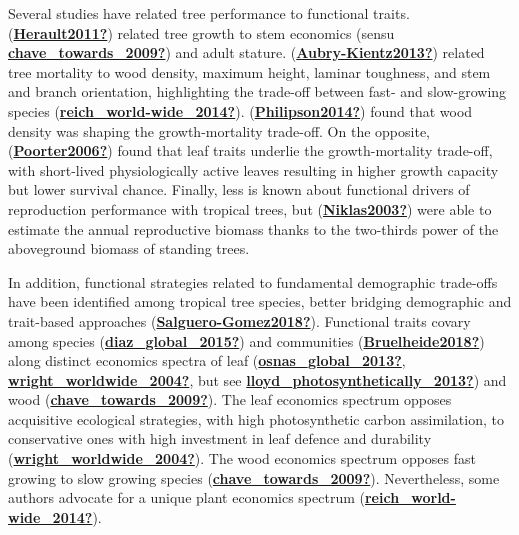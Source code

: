 \documentclass[12pt,twoside,a4paper, a]{article}
\begin{document}
Several studies have related tree performance to functional traits.
(\protect\hyperlink{ref-Herault2011}{\textbf{Herault2011?}}) related tree growth to stem economics (sensu \protect\hyperlink{ref-chave_towards_2009}{\textbf{chave\_towards\_2009?}}) and adult stature.
(\protect\hyperlink{ref-Aubry-Kientz2013}{\textbf{Aubry-Kientz2013?}}) related tree mortality to wood density, maximum height, laminar toughness, and stem and branch orientation, highlighting the trade-off between fast- and slow-growing species (\protect\hyperlink{ref-reich_world-wide_2014}{\textbf{reich\_world-wide\_2014?}}).
(\protect\hyperlink{ref-Philipson2014}{\textbf{Philipson2014?}}) found that wood density was shaping the growth-mortality trade-off.
On the opposite, (\protect\hyperlink{ref-Poorter2006}{\textbf{Poorter2006?}}) found that leaf traits underlie the growth-mortality trade-off,
with short-lived physiologically active leaves resulting in higher growth capacity but lower survival chance.
Finally, less is known about functional drivers of reproduction performance with tropical trees,
but (\protect\hyperlink{ref-Niklas2003}{\textbf{Niklas2003?}}) were able to estimate the annual reproductive biomass thanks to the two-thirds power of the aboveground biomass of standing trees.

In addition, functional strategies related to fundamental demographic trade-offs have been identified among tropical tree species, better bridging demographic and trait-based approaches (\protect\hyperlink{ref-Salguero-Gomez2018}{\textbf{Salguero-Gomez2018?}}).
Functional traits covary among species (\protect\hyperlink{ref-diaz_global_2015}{\textbf{diaz\_global\_2015?}}) and communities (\protect\hyperlink{ref-Bruelheide2018}{\textbf{Bruelheide2018?}}) along distinct economics spectra of leaf (\protect\hyperlink{ref-osnas_global_2013}{\textbf{osnas\_global\_2013?}}, \protect\hyperlink{ref-wright_worldwide_2004}{\textbf{wright\_worldwide\_2004?}}, but see \protect\hyperlink{ref-lloyd_photosynthetically_2013}{\textbf{lloyd\_photosynthetically\_2013?}}) and wood (\protect\hyperlink{ref-chave_towards_2009}{\textbf{chave\_towards\_2009?}}).
The leaf economics spectrum opposes acquisitive ecological strategies, with high photosynthetic carbon assimilation, to conservative ones with high investment in leaf defence and durability (\protect\hyperlink{ref-wright_worldwide_2004}{\textbf{wright\_worldwide\_2004?}}).
The wood economics spectrum opposes fast growing to slow growing species (\protect\hyperlink{ref-chave_towards_2009}{\textbf{chave\_towards\_2009?}}).
Nevertheless, some authors advocate for a unique plant economics spectrum (\protect\hyperlink{ref-reich_world-wide_2014}{\textbf{reich\_world-wide\_2014?}}).
\end{document}
